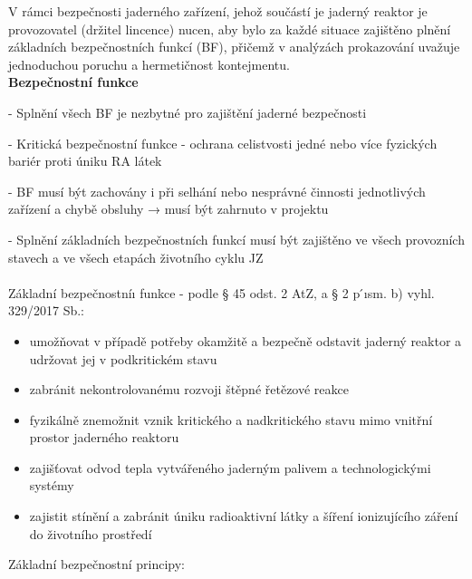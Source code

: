 V rámci bezpečnosti jaderného zařízení, jehož součástí je jaderný reaktor je provozovatel (držitel lincence) nucen, aby bylo za každé situace zajištěno plnění základních bezpečnostních funkcí (BF), přičemž v analýzách prokazování uvažuje jednoduchou poruchu a hermetičnost kontejmentu.
\\

\textbf{Bezpečnostní funkce}

\noindent - Splnění všech BF je nezbytné pro zajištění jaderné bezpečnosti

\noindent - Kritická bezpečnostní funkce - ochrana celistvosti jedné nebo více fyzických bariér proti úniku RA látek

\noindent  - BF musí být zachovány i při selhání nebo nesprávné činnosti jednotlivých zařízení a chybě obsluhy → musí být zahrnuto v projektu

\noindent  - Splnění základních bezpečnostních funkcí musí být zajištěno ve všech provozních stavech a ve všech etapách
životního cyklu JZ
\\
\\
\noindent  Základní bezpečnostníı funkce - podle § 45 odst. 2 AtZ, a § 2
p ́ısm. b) vyhl. 329/2017 Sb.:
\begin{itemize}
        \item umožňovat v případě potřeby okamžitě a bezpečně odstavit jaderný reaktor a udržovat jej v podkritickém stavu
        \item zabránit nekontrolovanému rozvoji štěpné řetězové reakce
        \item fyzikálně znemožnit vznik kritického a nadkritického stavu mimo vnitřní prostor jaderného reaktoru
        \item zajišťovat odvod tepla vytvářeného jaderným palivem a technologickými systémy
        \item zajistit stínění a zabránit úniku radioaktivní látky a šíření ionizujícího záření do životního prostředí
    \end{itemize}

Základní bezpečnostní principy:

